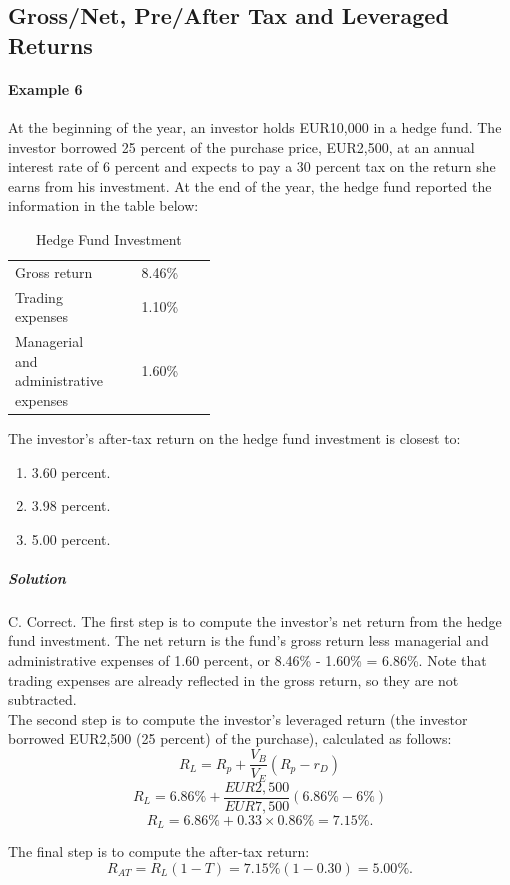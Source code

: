 \subsection{Gross/Net, Pre/After Tax and Leveraged Returns}
\paragraph{Example 6} %
At the beginning of the year, an investor holds EUR10,000 in a hedge fund. The investor borrowed 25 percent of the purchase price, EUR2,500, at an annual interest rate of 6 percent and expects to pay a 30 percent tax on the return she earns from his investment. At the end of the year, the hedge fund reported the information in the table below:

\begin{table}[H]
	\caption{Hedge Fund Investment}
	\begin{center}
		\begin{tabular}{p{0.4\linewidth} c}
			\toprule
			Gross return	& 8.46\% \\
			Trading expenses	& 1.10\% \\
			Managerial and administrative expenses	& 1.60\% \\
			\bottomrule
		\end{tabular}
	\end{center}
\end{table}
The investor's after-tax return on the hedge fund investment is closest to:
\begin{enumerate}[label=\Alph*.]
	\item 3.60 percent.
	\item 3.98 percent.
	\item 5.00 percent.
\end{enumerate}
\subparagraph{Solution} %
C. Correct. The first step is to compute the investor's net return from the hedge fund investment.
The net return is the fund's gross return less managerial and administrative expenses of 1.60 percent, or 8.46\% - 1.60\% = 6.86\%.
Note that trading expenses are already reflected in the gross return, so they are not subtracted.\\
The second step is to compute the investor's leveraged return (the investor borrowed EUR2,500 (25 percent) of the purchase), calculated as follows:
\[
R_L=R_p+\frac{V_B}{V_E}(R_p-r_D)
\]
\[
R_L=6.86\% + \frac{EUR2,500}{EUR7,500}(6.86\%-6\%)
\]
\[
R_L= 6.86\% + 0.33\times0.86\% = 7.15\%.
\]

The final step is to compute the after-tax return:
\[
R_{AT} = R_L(1 - T) = 7.15\%(1 - 0.30) = 5.00\%.
\]
\newpage
